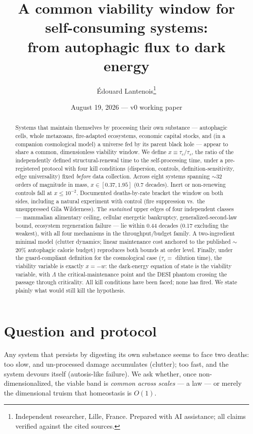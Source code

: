 \documentclass[11pt]{article}
\title{\textbf{A common viability window for self-consuming systems:\\ from autophagic flux to dark energy}}
\author{\'Edouard Lantenois\thanks{Independent researcher, Lille, France. Prepared with AI assistance; all claims verified against the cited sources.}}
\date{August 19, 2026 --- v0 working paper}
\begin{document}
\maketitle
\begin{abstract}
Systems that maintain themselves by processing their own substance --- autophagic cells, whole
metazoans, fire-adapted ecosystems, economic capital stocks, and (in a companion cosmological
model) a universe fed by its parent black hole --- appear to share a common, dimensionless
viability window. We define $x \equiv \tau_c/\tau_s$, the ratio of the independently defined
structural-renewal time to the self-processing time, under a pre-registered protocol with four
kill conditions (dispersion, controls, definition-sensitivity, edge universality) fixed
\emph{before} data collection. Across eight systems spanning $\sim$32 orders of magnitude in
mass, $x \in [0.37, 1.95]$ (0.7 decades). Inert or non-renewing controls fall at $x \le 10^{-2}$.
Documented deaths-by-rate bracket the window on both sides, including a natural experiment with
control (fire suppression vs.\ the unsuppressed Gila Wilderness). The \emph{sustained} upper edges
of four independent classes --- mammalian alimentary ceiling, cellular energetic bankruptcy,
generalized-second-law bound, ecosystem regeneration failure --- lie within 0.44 decades
(0.17 excluding the weakest), with all four mechanisms in the throughput/budget family. A
two-ingredient minimal model (clutter dynamics; linear maintenance cost anchored to the published
$\sim$20\% autophagic calorie budget) reproduces both bounds at order level. Finally, under the
guard-compliant definition for the cosmological case ($\tau_c = $ dilution time), the viability
variable is exactly $x = -w$: the dark-energy equation of state is the viability variable, with
$\Lambda$ the critical-maintenance point and the DESI phantom crossing the passage through
criticality. All kill conditions have been faced; none has fired. We state plainly what would
still kill the hypothesis.
\end{abstract}

\section{Question and protocol}
Any system that persists by digesting its own substance seems to face two deaths: too slow, and
un-processed damage accumulates (clutter); too fast, and the system devours itself (autosis-like
failure). We ask whether, once non-dimensionalized, the viable band is \emph{common across scales}
--- a law --- or merely the dimensional truism that homeostasis is $O(1)$.
\end{document}
